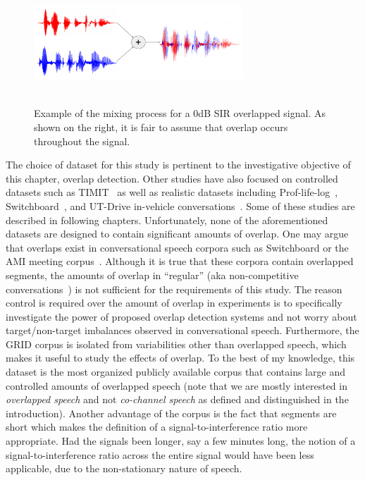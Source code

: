 \vspace{0mm}
\begin{figure}[h!]
	\centering
	\includegraphics[height =1.8in, width=0.7\textwidth]{figures/GRID_example_overlap-crop}
	\vspace{-2mm}
	\caption{ 
		Example of the mixing process for a 0dB SIR overlapped signal. As shown on the right, it is fair to assume that overlap occurs throughout the signal.}
	\label{fig:ch2_overlap_example}
\end{figure}

The choice of dataset for this study is pertinent to the investigative objective of this chapter, overlap detection. 
Other studies have also focused on controlled datasets such as TIMIT~\cite{nav_icassp13} as well as realistic datasets including Prof-life-log~\cite{ziaei2013prof,nav_icassp15}, Switchboard~\cite{shokouhi2015}, and UT-Drive in-vehicle conversations~\cite{sathyanarayana2013belt}. 
Some of these studies are described in following chapters. 
Unfortunately, none of the aforementioned datasets are designed to contain significant amounts of overlap. 
One may argue that overlaps exist in conversational speech corpora such as Switchboard or the AMI meeting corpus~\cite{amicorpus}. 
Although it is true that these corpora contain overlapped segments, the amounts of overlap in ``regular'' (aka non-competitive conversations~\cite{schegloff2000overlapping}) is not sufficient for the requirements of this study. 
The reason control is required over the amount of overlap in experiments is to specifically investigate the power of proposed overlap detection systems and not worry about target/non-target imbalances observed in conversational speech. 
Furthermore, the GRID corpus is isolated from variabilities other than overlapped speech, which makes it useful to study the effects of overlap. 
To the best of my knowledge, this dataset is the most organized publicly available corpus that contains large and controlled amounts of overlapped speech (note that we are mostly interested in {\it overlapped speech} and not {\it co-channel speech} as defined and distinguished in the introduction). 
Another advantage of the corpus is the fact that segments are short which makes the definition of a signal-to-interference ratio more appropriate. Had the signals been longer, say a few minutes long, the notion of a signal-to-interference ratio across the entire signal would have been less applicable, due to the non-stationary nature of speech. 

